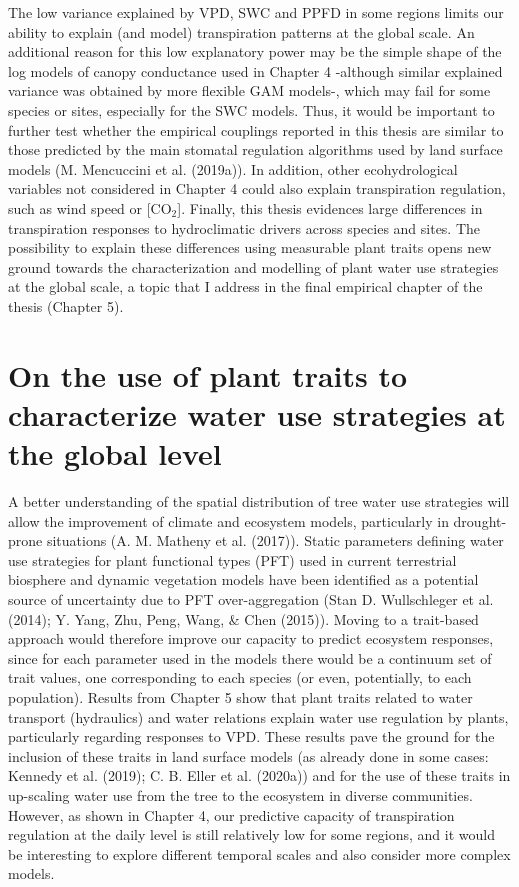 \documentclass[11pt,twoside]{reedthesis}
\begin{document}
The low variance explained by VPD, SWC and PPFD in some regions limits
our ability to explain (and model) transpiration patterns at the global
scale. An additional reason for this low explanatory power may be the
simple shape of the log models of canopy conductance used in Chapter 4
-although similar explained variance was obtained by more flexible GAM
models-, which may fail for some species or sites, especially for the
SWC models. Thus, it would be important to further test whether the
empirical couplings reported in this thesis are similar to those
predicted by the main stomatal regulation algorithms used by land
surface models (M. Mencuccini et al. (2019a)). In addition, other
ecohydrological variables not considered in Chapter 4 could also explain
transpiration regulation, such as wind speed or {[}\(\text{CO}_2\){]}.
Finally, this thesis evidences large differences in transpiration
responses to hydroclimatic drivers across species and sites. The
possibility to explain these differences using measurable plant traits
opens new ground towards the characterization and modelling of plant
water use strategies at the global scale, a topic that I address in the
final empirical chapter of the thesis (Chapter 5).\par

\section{On the use of plant traits to characterize water use strategies
at the global
level}\label{on-the-use-of-plant-traits-to-characterize-water-use-strategies-at-the-global-level}

A better understanding of the spatial distribution of tree water use
strategies will allow the improvement of climate and ecosystem models,
particularly in drought-prone situations (A. M. Matheny et al. (2017)).
Static parameters defining water use strategies for plant functional
types (PFT) used in current terrestrial biosphere and dynamic vegetation
models have been identified as a potential source of uncertainty due to
PFT over-aggregation (Stan D. Wullschleger et al. (2014); Y. Yang, Zhu,
Peng, Wang, \& Chen (2015)). Moving to a trait-based approach would
therefore improve our capacity to predict ecosystem responses, since for
each parameter used in the models there would be a continuum set of
trait values, one corresponding to each species (or even, potentially,
to each population). Results from Chapter 5 show that plant traits
related to water transport (hydraulics) and water relations explain
water use regulation by plants, particularly regarding responses to VPD.
These results pave the ground for the inclusion of these traits in land
surface models (as already done in some cases: Kennedy et al. (2019); C.
B. Eller et al. (2020a)) and for the use of these traits in up-scaling
water use from the tree to the ecosystem in diverse communities.
However, as shown in Chapter 4, our predictive capacity of transpiration
regulation at the daily level is still relatively low for some regions,
and it would be interesting to explore different temporal scales and
also consider more complex models.\par
\end{document}
